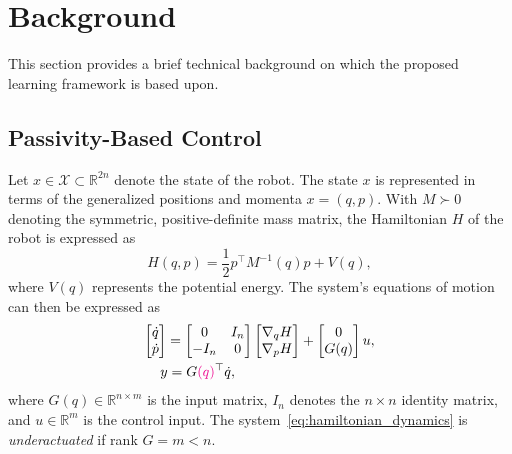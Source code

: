 \section{Background}

This section provides a brief technical background on which the proposed
learning framework is based upon. 

\subsection{Passivity-Based Control}
\label{ssec:pbc}

Let $x \in \mathcal{X} \subset \mathbb{R}^{2n}$ denote the state of the robot.
%
The state $x$ is represented in terms of the generalized positions and momenta
$x = (q, p)$. 
%
With $M \succ 0$ denoting the symmetric, positive-definite mass matrix, the Hamiltonian
$H$ of the robot is expressed as 
%
\begin{equation}
    H(q,p) = \frac{1}{2} p^\top M^{-1}(q) p + V(q),
    \label{eq:system_hamiltonian}
\end{equation}
%
where $V(q)$ represents the potential energy. The system's equations of motion
can then be expressed as 
%
\begin{align}
    \begin{split}  
      \bmat{\dot{q} \\ \dot{p}} &= \bmat{0 & I_n \\ -I_n & 0}\bmat{\nabla_qH \\
      \nabla_pH} + \bmat{0 \\ G(q)}u, \\
      &\hspace{-0.15cm} y = G\textcolor{magenta}{(q)}^\top \dot{q},
    \end{split}
    \label{eq:hamiltonian_dynamics}
\end{align}
%
where $G(q) \in \mathbb{R}^{n \times m}$ is the input matrix, $I_n$ denotes the
$n \times n$ identity matrix, and $u \in \mathbb{R}^m$ is
the control input.
%
The system~\eqref{eq:hamiltonian_dynamics} is \textit{underactuated} if rank $G
= m < n$.



